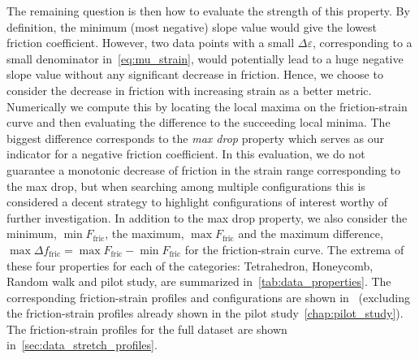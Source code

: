 The remaining question is then how to evaluate the
strength of this property. By definition, the minimum (most negative) slope
value would give the lowest friction coefficient. However, two data points with
a small $\Delta \varepsilon$, corresponding to a small denominator
in~\cref{eq:mu_strain}, would potentially lead to a huge negative slope value
without any significant decrease in friction. Hence, we choose to consider the decrease in friction with increasing strain as a better metric. Numerically we
compute this by locating the local maxima on the friction-strain curve and then
evaluating the difference to the succeeding local minima. The biggest difference
corresponds to the \textit{max drop} property which serves as our indicator for a
negative friction coefficient. In this evaluation, we do not guarantee a
monotonic decrease of friction in the strain range corresponding to the max drop, but when
searching among multiple configurations this is considered a decent strategy to
highlight configurations of interest worthy of further investigation. In
addition to the max drop property, we also consider the minimum, $\min
F_{\text{fric}}$, the maximum, $\max F_{\text{fric}}$ and the
maximum difference, $\max \Delta f_{\text{fric}} = \max F_{\text{fric}} - \min
F_{\text{fric}}$ for the friction-strain curve. The extrema of these four properties for each of the
categories: Tetrahedron, Honeycomb, Random walk and pilot study, are summarized
in~\cref{tab:data_properties}. The corresponding friction-strain profiles and
configurations are shown in~ (excluding
the friction-strain profiles already shown in the pilot study~\cref{chap:pilot_study}). The friction-strain profiles for the full dataset are shown in~\cref{sec:data_stretch_profiles}. 



